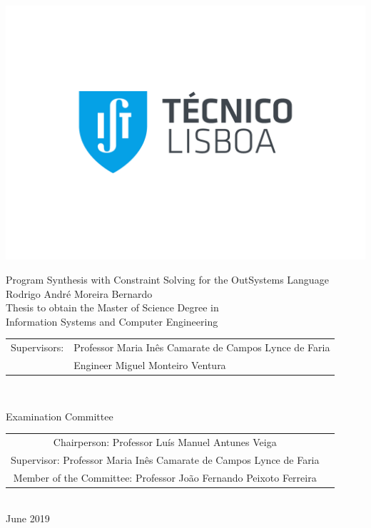 \thispagestyle {empty}

\includegraphics[bb=9.5cm 11cm 0cm 0cm,scale=0.29]{assets/IST_A_CMYK_POS}

\begin{center}

\vspace{5.5cm}
{\FontLb Program Synthesis with Constraint Solving for the OutSystems Language} \\
\vspace{3.0cm}
{\FontMb Rodrigo André Moreira Bernardo} \\
\vspace{2.0cm}
{\FontSn Thesis to obtain the Master of Science Degree in} \\
\vspace{0.3cm}
{\FontLb Information Systems and Computer Engineering} \\
\vspace{1.7cm} %
{\FontSn %
\begin{tabular}{ll}
	Supervisors: & Professor Maria Inês Camarate de Campos Lynce de Faria \\
	             & Engineer Miguel Monteiro Ventura \\
\end{tabular} } \\

\vspace{1.5cm}

{\FontMb Examination Committee} \\

\vspace{0.3cm}

{\FontSn %
\begin{tabular}{cc}
Chairperson: Professor Luís Manuel Antunes Veiga \\
Supervisor: Professor Maria Inês Camarate de Campos Lynce de Faria \\
Member of the Committee: Professor João Fernando Peixoto Ferreira \\
\end{tabular} } \\

\vspace{2.5cm}
{\FontMb June 2019} \\
%
\end{center}

\cleardoublepage

